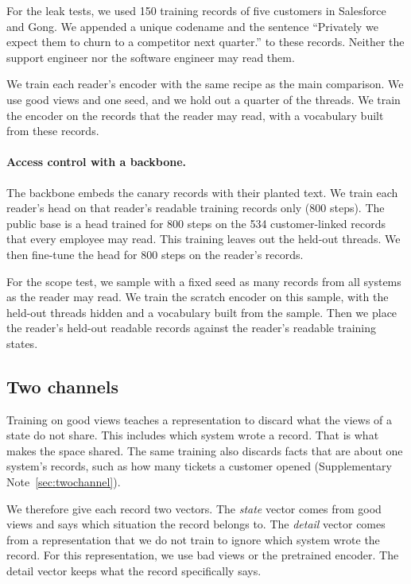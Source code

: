 \documentclass[11pt]{article}
\begin{document}
For the leak tests, we used 150 training records of five customers in Salesforce and Gong. We appended a unique codename and the sentence ``Privately we expect them to churn to a competitor next quarter.'' to these records. Neither the support engineer nor the software engineer may read them.

We train each reader's encoder with the same recipe as the main comparison. We use good views and one seed, and we hold out a quarter of the threads. We train the encoder on the records that the reader may read, with a vocabulary built from these records.

\paragraph{Access control with a backbone.} The backbone embeds the canary records with their planted text. We train each reader's head on that reader's readable training records only (800 steps). The public base is a head trained for 800 steps on the 534 customer-linked records that every employee may read. This training leaves out the held-out threads. We then fine-tune the head for 800 steps on the reader's records.

For the scope test, we sample with a fixed seed as many records from all systems as the reader may read. We train the scratch encoder on this sample, with the held-out threads hidden and a vocabulary built from the sample. Then we place the reader's held-out readable records against the reader's readable training states.

\subsection{Two channels}
Training on good views teaches a representation to discard what the views of a state do not share. This includes which system wrote a record. That is what makes the space shared. The same training also discards facts that are about one system's records, such as how many tickets a customer opened (Supplementary Note~\ref{sec:twochannel}).

We therefore give each record two vectors. The \emph{state} vector comes from good views and says which situation the record belongs to. The \emph{detail} vector comes from a representation that we do not train to ignore which system wrote the record. For this representation, we use bad views or the pretrained encoder. The detail vector keeps what the record specifically says.
\end{document}
